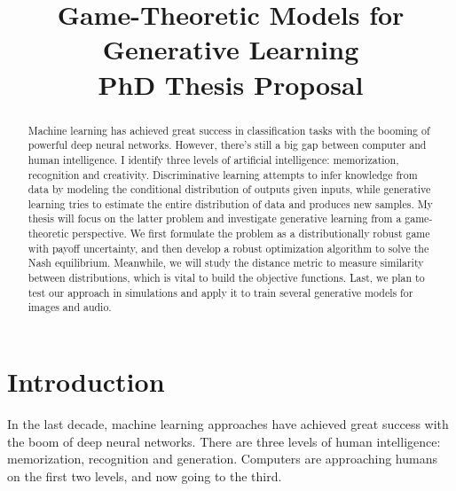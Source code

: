 \documentclass{article}
\title{Game-Theoretic Models for Generative Learning \\{\normalsize PhD Thesis Proposal}
}
\begin{document}

\maketitle

\begin{abstract}
Machine learning has achieved great success in classification tasks with the booming of powerful deep neural networks. However, there's still a big gap between computer and human intelligence. I identify three levels of artificial intelligence: memorization, recognition and creativity.
Discriminative learning attempts to infer knowledge from data by modeling the conditional distribution of outputs given inputs, while generative learning tries to estimate the entire distribution of data and produces new samples.
My thesis will focus on the latter problem and investigate generative learning from a game-theoretic perspective. We first formulate the problem as a distributionally robust game with payoff uncertainty, and then develop a robust optimization algorithm to solve the Nash equilibrium.
Meanwhile, we will study the distance metric to measure similarity between distributions, which is vital to build the objective functions.
Last, we plan to test our approach in simulations and apply it to train several generative models for images and audio.

\end{abstract}



\section{Introduction}
\label{Sec:Intro}

In the last decade, machine learning approaches have achieved great success with the boom of deep neural networks. There are three levels of human intelligence: memorization, recognition and generation. Computers are approaching humans on the first two levels, and now going to the third.
\end{document}
